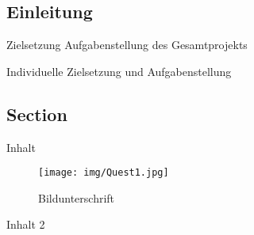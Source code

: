 \begin{inhalt}
\renewcommand*\chapterpagestyle{scrheadings}
\chapter{Einleitung}
Zielsetzung Aufgabenstellung des Gesamtprojekts

Individuelle Zielsetzung und Aufgabenstellung



\section{Section}
Inhalt

\begin{figure}[!htb]
\centering
\texttt{[image: img/Quest1.jpg]}
\caption[Bildbezeichnung für Abbildungsverzeichnis]{Bildunterschrift}
\label{labelname}
\end{figure}

Inhalt 2

\end{inhalt}